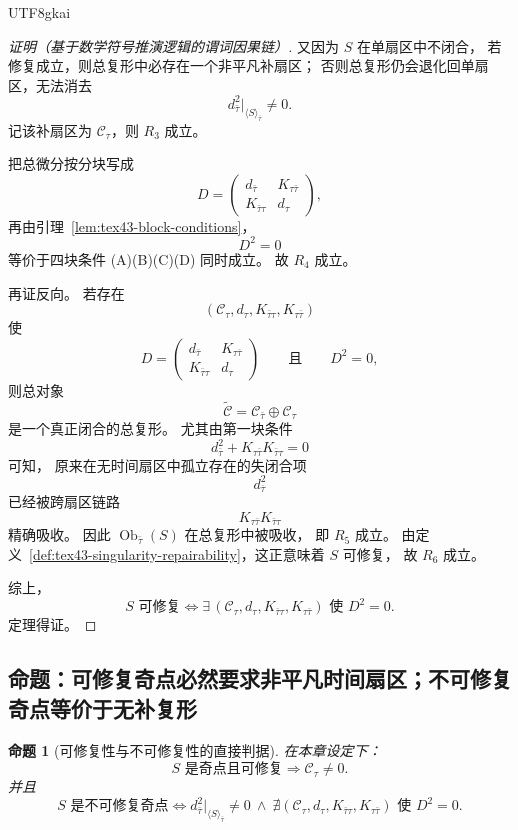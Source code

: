 \documentclass[12pt]{article}
\newtheorem{proposition}{命题}[section]
\begin{document}
\begin{CJK*}{UTF8}{gkai}
\begin{proof}[证明（基于数学符号推演逻辑的谓词因果链）]
又因为 $S$ 在单扇区中不闭合，
若修复成立，则总复形中必存在一个非平凡补扇区；
否则总复形仍会退化回单扇区，无法消去
\[
  d_{\bar\tau}^2\big|_{\langle S\rangle_{\bar\tau}}\neq 0.
\]
记该补扇区为 $\mathcal C_\tau$，则 $R_3$ 成立。

把总微分按分块写成
\[
  D=
  \begin{pmatrix}
    d_{\bar\tau} & K_{\tau\bar\tau}\\
    K_{\bar\tau\tau} & d_\tau
  \end{pmatrix},
\]
再由引理~\ref{lem:tex43-block-conditions}，
\[
  D^2=0
\]
等价于四块条件 (A)(B)(C)(D) 同时成立。
故 $R_4$ 成立。

再证反向。
若存在
\[
  (\mathcal C_\tau,d_\tau,K_{\bar\tau\tau},K_{\tau\bar\tau})
\]
使
\[
  D=
  \begin{pmatrix}
    d_{\bar\tau} & K_{\tau\bar\tau}\\
    K_{\bar\tau\tau} & d_\tau
  \end{pmatrix}
  \qquad\text{且}\qquad
  D^2=0,
\]
则总对象
\[
  \widetilde{\mathcal C}
  =
  \mathcal C_{\bar\tau}\oplus \mathcal C_\tau
\]
是一个真正闭合的总复形。
尤其由第一块条件
\[
  d_{\bar\tau}^2 + K_{\tau\bar\tau}K_{\bar\tau\tau}=0
\]
可知，
原来在无时间扇区中孤立存在的失闭合项
\[
  d_{\bar\tau}^2
\]
已经被跨扇区链路
\[
  K_{\tau\bar\tau}K_{\bar\tau\tau}
\]
精确吸收。
因此 $\operatorname{Ob}_{\bar\tau}(S)$ 在总复形中被吸收，
即 $R_5$ 成立。
由定义~\ref{def:tex43-singularity-repairability}，这正意味着 $S$ 可修复，
故 $R_6$ 成立。

综上，
\[
  S\text{ 可修复}
  \iff
  \exists\,
  (\mathcal C_\tau,d_\tau,K_{\bar\tau\tau},K_{\tau\bar\tau})
  \text{ 使 }D^2=0.
\]
定理得证。
\end{proof}

\subsection{命题：可修复奇点必然要求非平凡时间扇区；不可修复奇点等价于无补复形}
\label{subsec:tex43-ch8-proposition}

\begin{proposition}[可修复性与不可修复性的直接判据]
\label{prop:tex43-repairable-irrepairable}
在本章设定下：
\[
  S\text{ 是奇点且可修复}
  \Rightarrow
  \mathcal C_\tau\neq 0.
\]
并且
\[
  S\text{ 是不可修复奇点}
  \iff
  d_{\bar\tau}^2\big|_{\langle S\rangle_{\bar\tau}}\neq 0
  \ \wedge\
  \nexists (\mathcal C_\tau,d_\tau,K_{\bar\tau\tau},K_{\tau\bar\tau})\text{ 使 }D^2=0.
\]
\end{proposition}


\end{CJK*}
\end{document}
